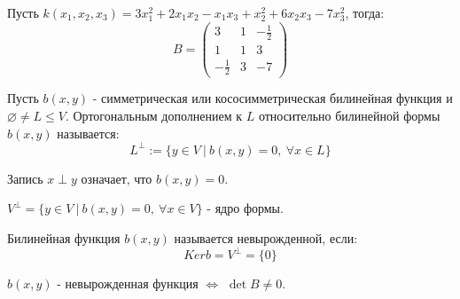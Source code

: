 \begin{example1}
    Пусть $k(x_1,x_2, x_3)=3x_1^2+2x_1x_2-x_1x_3+x_2^2+6x_2x_3-7x_3^2$, тогда:
        $$B=\begin{pmatrix}
        3 & 1 & -\frac{1}{2}\\
        1 & 1 &  3\\
        -\frac{1}{2} &  3 & -7
        \end{pmatrix}$$
\end{example1}
\begin{definition}
    Пусть $b(x,y)$ - симметрическая или кососимметрическая билинейная функция и $\varnothing \neq L\leqslant V$. Ортогональным дополнением к $L$ относительно билинейной формы $b(x,y)$ называется: 
    $$L^{\perp}:=\{y\in V \ | \ b(x,y)=0, \ \forall x\in L\}$$
\end{definition}
\begin{remark}
    Запись $x\perp y$ означает, что $b(x,y)=0$.
\end{remark}
\begin{definition}
    $V^{\perp}=\{y\in V \ | \ b(x,y)=0, \ \forall x\in V\}$ - ядро формы.
\end{definition}
\begin{definition}
    Билинейная функция $b(x,y)$ называется невырожденной, если: 
    $$Kerb=V^{\perp}=\{0\}$$
\end{definition}
\begin{exercise}
    $b(x,y)$ - невырожденная функция $\Longleftrightarrow$ $\det B\neq0$.
\end{exercise}
